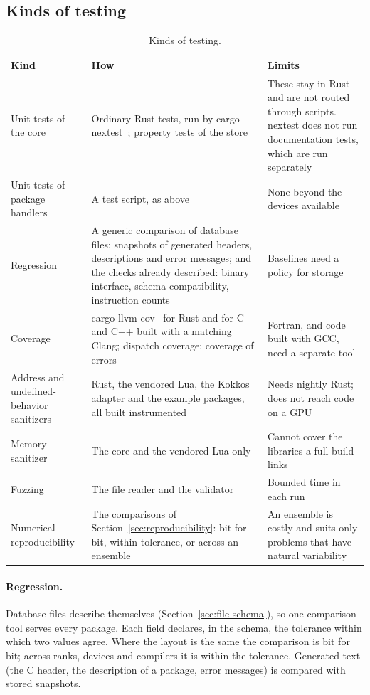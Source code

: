 \documentclass[11pt,a4paper]{article}
\begin{document}
\subsection{Kinds of testing}

\begin{table}[ht]
\centering
\small
\begin{tabularx}{\textwidth}{@{}>{\raggedright\arraybackslash}p{30mm} L L@{}}
\toprule
Kind & How & Limits \\
\midrule
Unit tests of the core & Ordinary Rust tests, run by cargo-nextest~\cite{nextest}; property tests of the store~\cite{proptest} & These stay in Rust and are not routed through scripts.  nextest does not run documentation tests, which are run separately \\
Unit tests of package handlers & A test script, as above & None beyond the devices available \\
Regression & A generic comparison of database files; snapshots of generated headers, descriptions and error messages; and the checks already described: binary interface, schema compatibility, instruction counts & Baselines need a policy for storage \\
Coverage & cargo-llvm-cov~\cite{cargollvmcov} for Rust and for C and C++ built with a matching Clang; dispatch coverage; coverage of errors & Fortran, and code built with GCC, need a separate tool \\
Address and undefined-behavior sanitizers & Rust, the vendored Lua, the Kokkos adapter and the example packages, all built instrumented & Needs nightly Rust; does not reach code on a GPU \\
Memory sanitizer & The core and the vendored Lua only & Cannot cover the libraries a full build links \\
Fuzzing & The file reader and the validator & Bounded time in each run \\
Numerical reproducibility & The comparisons of Section~\ref{sec:reproducibility}: bit for bit, within tolerance, or across an ensemble & An ensemble is costly and suits only problems that have natural variability \\
\bottomrule
\end{tabularx}
\caption{Kinds of testing.}
\label{tab:testkinds}
\end{table}

\paragraph{Regression.}  Database files describe themselves
(Section~\ref{sec:file-schema}), so one comparison tool serves every
package.  Each field declares, in the schema, the tolerance within which
two values agree.  Where the layout is the same the comparison is bit for
bit; across ranks, devices and compilers it is within the tolerance.
Generated text (the C header, the description of a package, error messages)
is compared with stored snapshots.
\end{document}
